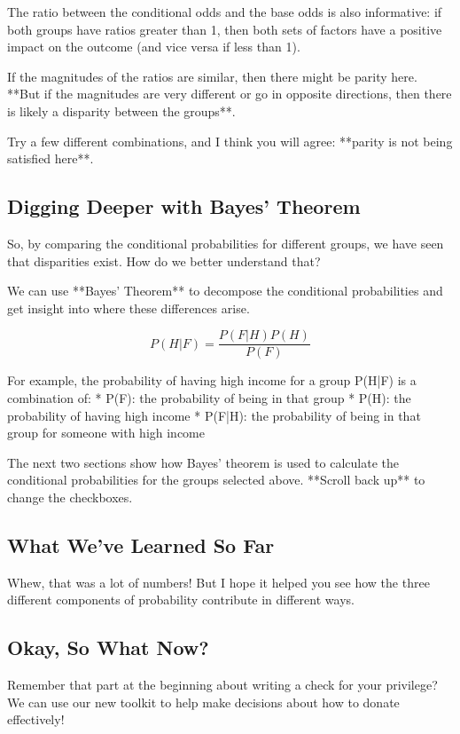 \documentclass[12pt]{article}
\begin{document}
The ratio between the conditional odds and the base odds is also informative: if both groups have ratios greater than 1, then both sets of factors have a positive impact on the outcome (and vice versa if less than 1). 

If the magnitudes of the ratios are similar, then there might be parity here. **But if the magnitudes are very different or go in opposite directions, then there is likely a disparity between the groups**.

Try a few different combinations, and I think you will agree: **parity is not being satisfied here**.

\subsection*{Digging Deeper with Bayes' Theorem}

So, by comparing the conditional probabilities for different groups, we have seen that disparities exist. How do we better understand that?

We can use **Bayes' Theorem** to decompose the conditional probabilities and get insight into where these differences arise. 

$$P(H|F) = \dfrac{P(F | H) P(H)}{P(F)}$$

For example, the probability of having high income for a group P(H|F) is a combination of: 
* P(F): the probability of being in that group
* P(H): the probability of having high income
* P(F|H): the probability of being in that group for someone with high income

The next two sections show how Bayes' theorem is used to calculate the conditional probabilities for the groups selected above. **Scroll back up** to change the checkboxes.

\subsection*{What We've Learned So Far}

Whew, that was a lot of numbers! But I hope it helped you see how the three different components of probability contribute in different ways.

\subsection*{Okay, So What Now?}

Remember that part at the beginning about writing a check for your privilege? We can use our new toolkit to help make decisions about how to donate effectively! 
\end{document}
